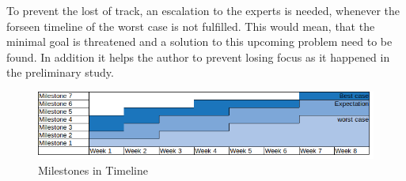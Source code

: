 To prevent the lost of track, an escalation to the experts is needed, whenever the forseen timeline of the worst case is not fulfilled. This would mean, that the minimal goal is threatened and a solution to this upcoming problem need to be found. In addition it helps the author to prevent losing focus as it happened in the preliminary study.

\begin{figure}[h]
	\begin{center}
		\centering
		\includegraphics[width=1.0\linewidth]{images/Milestones.png}
		\caption{Milestones in Timeline}
		\label{fig:milestones}
	\end{center}
\end{figure}
